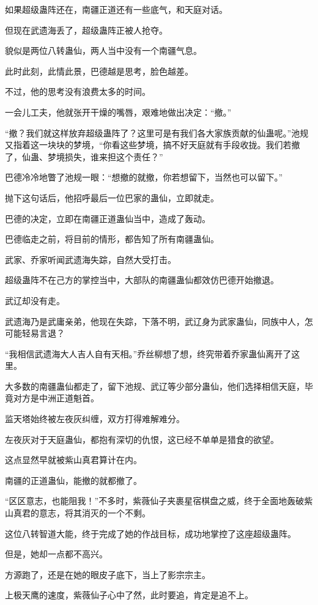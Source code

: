 \begin{this_body}
如果超级蛊阵还在，南疆正道还有一些底气，和天庭对话。

但现在武遗海丢了，超级蛊阵正被人抢夺。

貌似是两位八转蛊仙，两人当中没有一个南疆气息。

此时此刻，此情此景，巴德越是思考，脸色越差。

不过，他的思考没有浪费太多的时间。

一会儿工夫，他就张开干燥的嘴唇，艰难地做出决定：“撤。”

“撤？我们就这样放弃超级蛊阵了？这里可是有我们各大家族贡献的仙蛊呢。”池规又指着这一块块的梦境，“你看这些梦境，搞不好天庭就有手段收拢。我们若撤了，仙蛊、梦境损失，谁来担这个责任？”

巴德冷冷地瞥了池规一眼：“想撤的就撤，你若想留下，当然也可以留下。”

抛下这句话后，他招呼最后一位巴家的蛊仙，立即就走。

巴德的决定，立即在南疆正道蛊仙当中，造成了轰动。

巴德临走之前，将目前的情形，都告知了所有南疆蛊仙。

武家、乔家听闻武遗海失踪，自然大受打击。

超级蛊阵不在己方的掌控当中，大部队的南疆蛊仙都效仿巴德开始撤退。

武辽却没有走。

武遗海乃是武庸亲弟，他现在失踪，下落不明，武辽身为武家蛊仙，同族中人，怎可能轻易言退？

“我相信武遗海大人吉人自有天相。”乔丝柳想了想，终究带着乔家蛊仙离开了这里。

大多数的南疆蛊仙都走了，留下池规、武辽等少部分蛊仙，他们选择相信天庭，毕竟对方是中洲正道魁首。

监天塔始终被左夜灰纠缠，双方打得难解难分。

左夜灰对于天庭蛊仙，都抱有深切的仇恨，这已经不单单是猎食的欲望。

这点显然早就被紫山真君算计在内。

南疆的正道蛊仙，能撤的就都撤了。

“区区意志，也能阻我！”不多时，紫薇仙子夹裹星宿棋盘之威，终于全面地轰破紫山真君的意志，将其消灭的一个不剩。

这位八转智道大能，终于完成了她的作战目标，成功地掌控了这座超级蛊阵。

但是，她却一点都不高兴。

方源跑了，还是在她的眼皮子底下，当上了影宗宗主。

上极天鹰的速度，紫薇仙子心中了然，此时要追，肯定是追不上。


\end{this_body}
